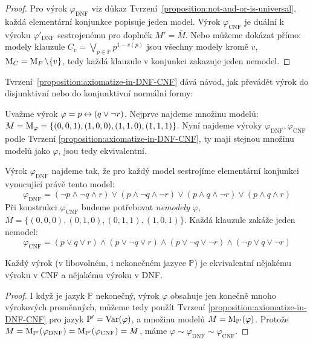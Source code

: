 \begin{proof}
    Pro výrok $\varphi_{\mathrm{DNF}}$ viz důkaz Tvrzení~\ref{proposition:not-and-or-is-universal}, každá elementární konjunkce popisuje jeden model. Výrok $\varphi_{\mathrm{CNF}}$ je duální k výroku $\varphi'_{\mathrm{DNF}}$ sestrojenému pro doplněk $M'=\overline{M}$. Nebo můžeme dokázat přímo: modely klauzule $C_v=\bigvee_{p\in\mathbb P}p^{1-v(p)}$ jsou všechny modely kromě $v$, $\operatorname{M}_C=\operatorname{M}_P\setminus\{v\}$, tedy každá klauzule v konjunkci zakazuje jeden nemodel.
\end{proof}

Tvrzení~\ref{proposition:axiomatize-in-DNF-CNF} dává návod, jak převádět výrok do disjunktivní nebo do konjunktivní normální formy:

\begin{example}
    Uvažme výrok $\varphi=p\mathbin{\leftrightarrow} (q\lor \neg r)$. Nejprve najdeme množinu modelů: $M=\operatorname{M}_\varphi=\{(0,0,1),(1,0,0),(1,1,0),(1,1,1)\}$. Nyní najdeme výroky $\varphi_{\mathrm{DNF}},\varphi_{\mathrm{CNF}}$ podle Tvrzení \ref{proposition:axiomatize-in-DNF-CNF}, ty mají stejnou množinu modelů jako $\varphi$, jsou tedy ekvivalentní.

    Výrok $\varphi_{\mathrm{DNF}}$ najdeme tak, že pro každý model sestrojíme elementární konjunkci vynucující právě tento model:
    $$
    \varphi_{\mathrm{DNF}}=(\neg p\land\neg q\land r)\lor (p\land\neg q\land\neg r) \lor (p\land q\land\neg r)\lor (p\land q\land r)
    $$
    Při konstrukci $\varphi_{\mathrm{CNF}}$ budeme potřebovat \emph{nemodely} $\varphi$, $\overline{M}=\{(0,0,0),(0,1,0),(0,1,1),(1,0,1)\}$. Každá klauzule zakáže jeden nemodel:
    $$
    \varphi_{\mathrm{CNF}}=(p\lor q\lor r)\land (p\lor\neg q\lor r) \land (p\lor \neg q\lor\neg r)\land (\neg p\lor q\lor\neg r)
    $$   
\end{example}

\begin{corollary}
    Každý výrok (v libovolném, i nekonečném jazyce $\mathbb P$) je ekvivalentní nějakému výroku v CNF a nějakému výroku v DNF.
\end{corollary}
\begin{proof}
I když je jazyk $\mathbb P$ nekonečný, výrok $\varphi$ obsahuje jen konečně mnoho výrokových proměnných, můžeme tedy použít Tvrzení \ref{proposition:axiomatize-in-DNF-CNF} pro jazyk $\mathbb P'=\operatorname{Var}(\varphi)$, a množinu modelů $M=\operatorname{M}_{\mathbb P'}(\varphi)$. Protože $M=\operatorname{M}_{\mathbb P'}(\varphi_{\mathrm{DNF}})=\operatorname{M}_{\mathbb P'}(\varphi_{\mathrm{CNF}})=M$, máme $\varphi\sim\varphi_{\mathrm{DNF}}\sim\varphi_{\mathrm{CNF}}$.
\end{proof}

